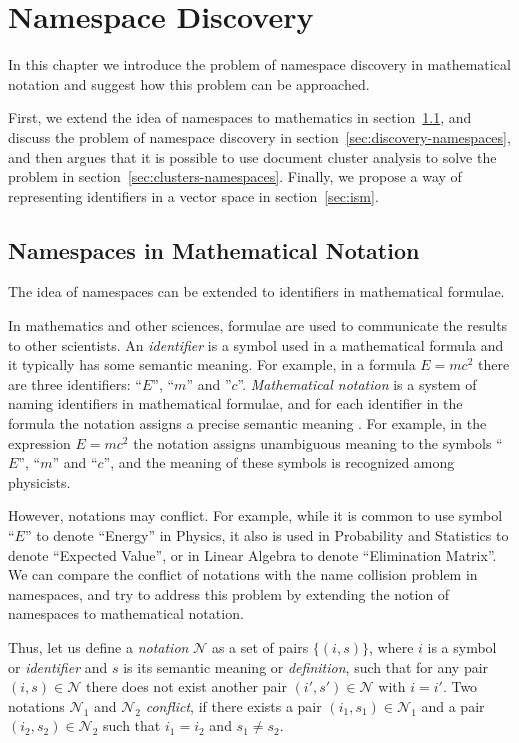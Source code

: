 \section{Namespace Discovery}

In this chapter we introduce the problem of namespace discovery in 
mathematical notation and suggest how this problem can be approached. 

First, we extend the idea of namespaces to mathematics in section~\ref{sec:math-namespaces},
and discuss the problem of namespace discovery in section~\ref{sec:discovery-namespaces},
and then argues that it is possible to use document cluster analysis 
to solve the problem in section~\ref{sec:clusters-namespaces}. 
Finally, we propose a way of representing identifiers in a vector space 
in section~\ref{sec:ism}.


\subsection{Namespaces in Mathematical Notation} \label{sec:math-namespaces}

The idea of namespaces can be extended to identifiers in mathematical
formulae. 

In mathematics and other sciences, formulae are used to communicate the results 
to other scientists. An \emph{identifier} is a symbol used in a mathematical 
formula and it typically has some semantic meaning. For example, in a formula 
$E = m c^2$ there are three identifiers: ``$E$'', ``$m$'' and ''$c$''.
\emph{Mathematical notation} is a system of naming identifiers in
mathematical formulae, and for each identifier in the formula the notation assigns
a precise semantic meaning \cite{wikinotation}. For example, in the expression
$E = mc^2$ the notation assigns
unambiguous meaning to the symbols ``$E$'', ``$m$'' and ``$c$'', and the
meaning of these symbols is recognized among physicists.

However, notations may conflict. For example, while it is common to use
symbol ``$E$'' to denote ``Energy'' in Physics, it also is used in Probability and
Statistics to denote ``Expected Value'', or in Linear Algebra to denote
``Elimination Matrix''.
We can compare the conflict of notations with the name collision problem
in namespaces, and try to address this problem by extending the notion of
namespaces to mathematical notation.

Thus, let us define a \emph{notation} $\mathcal N$ as a set of pairs $\{ (i, s) \}$,
where $i$ is a symbol or \emph{identifier} and $s$ is its semantic meaning
or \emph{definition}, such that for any pair $(i, s) \in \mathcal N$ there
does not exist another pair $(i', s') \in \mathcal N$ with $i = i'$.
Two notations $\mathcal N_1$ and $\mathcal N_2$
\emph{conflict}, if there exists a pair $(i_1, s_1) \in \mathcal N_1$ and a pair
$(i_2, s_2) \in \mathcal N_2$ such that $i_1 = i_2$ and $s_1 \ne s_2$.

